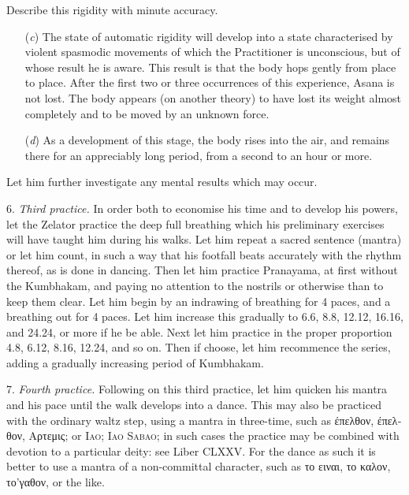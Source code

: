 Describe this rigidity with minute accuracy.

\begin{enumerate}
\item[(\textit{c})] The state of automatic rigidity will develop into a state characterised by violent spasmodic movements of which the Practitioner is unconscious, but of whose result he is aware. This result is that the body hops gently from place to place. After the first two or three occurrences of this experience, Asana is not lost. The body appears (on another theory) to have lost its weight almost completely and to be moved by an unknown force.
\item[(\textit{d})] As a development of this stage, the body rises into the air, and remains there for an appreciably long period, from a second to an hour or more.
\end{enumerate}
Let him further investigate any mental results which may occur.

6. \textit{Third practice.} In order both to economise his time and to develop his powers, let the Zelator practice the deep full breathing which his preliminary exercises will have taught him during his walks. Let him repeat a sacred sentence (mantra) or let him count, in such a way that his footfall beats accurately with the rhythm thereof, as is done in dancing. Then let him practice Pranayama, at first without the Kumbhakam, and paying no attention to the nostrils or otherwise than to keep them clear. Let him begin by an indrawing of breathing for 4 paces, and a breathing out for 4 paces. Let him increase this gradually to 6.6, 8.8, 12.12, 16.16, and 24.24, or more if he be able. Next let him practice in the proper proportion 4.8, 6.12, 8.16, 12.24, and so on. Then if choose, let him recommence the series, adding a gradually increasing period of Kumbhakam.

7. \textit{Fourth practice.} Following on this third practice, let him quicken his mantra and his pace until the walk develops into a dance. This may also be practiced with the ordinary waltz step, using a mantra in three-time, such as \textgreek{\'{ε}πελθον}, \textgreek{\'{ε}πελθον}, \textgreek{Αρτεμις}; or \textsc{Iao; Iao Sabao}; in such cases the practice may be combined with devotion to a particular deity: see Liber CLXXV. For the dance as such it is better to use a mantra of a non-committal character, such as \textgreek{το} \textgreek{ειναι}, \textgreek{το} \textgreek{καλον}, \textgreek{το’γαθον}, or the like.

